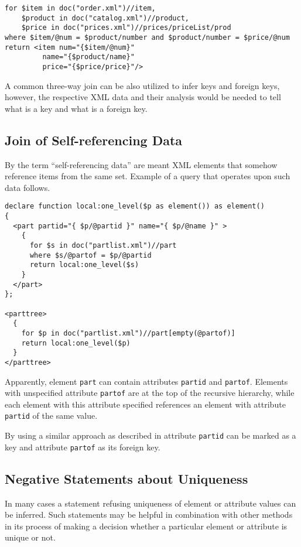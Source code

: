 \begin{verbatim}
for $item in doc("order.xml")//item, 
    $product in doc("catalog.xml")//product, 
    $price in doc("prices.xml")//prices/priceList/prod 
where $item/@num = $product/number and $product/number = $price/@num 
return <item num="{$item/@num}" 
         name="{$product/name}" 
         price="{$price/price}"/>
\end{verbatim}

A common three-way join can be also utilized to infer keys and foreign keys, however, the respective XML data and their analysis would be needed to tell what is a key and what is a foreign key.

\subsection{Join of Self-referencing Data}
By the term ``self-referencing data'' are meant XML elements that somehow reference items from the same set. Example of a query that operates upon such data follows.

\begin{verbatim}
declare function local:one_level($p as element()) as element()
{
  <part partid="{ $p/@partid }" name="{ $p/@name }" >
    {
      for $s in doc("partlist.xml")//part
      where $s/@partof = $p/@partid
      return local:one_level($s)
    }
  </part>
};

<parttree>
  {
    for $p in doc("partlist.xml")//part[empty(@partof)]
    return local:one_level($p)
  }
</parttree>
\end{verbatim}

Apparently, element \texttt{part} can contain attributes \texttt{partid} and \texttt{partof}. Elements with unspecified attribute \texttt{partof} are at the top of the recursive hierarchy, while each element with this attribute specified references an element with attribute \texttt{partid} of the same value.

By using a similar approach as described in \cite{Necasky:2009:DXK:1529282.1529414} attribute \texttt{partid} can be marked as a key and attribute \texttt{partof} as its foreign key.

\subsection{Negative Statements about Uniqueness} \label{Negative_uniqueness}
In many cases a statement refusing uniqueness of element or attribute values can be inferred. Such statements may be helpful in combination with other methods in its process of making a decision whether a particular element or attribute is unique or not.

